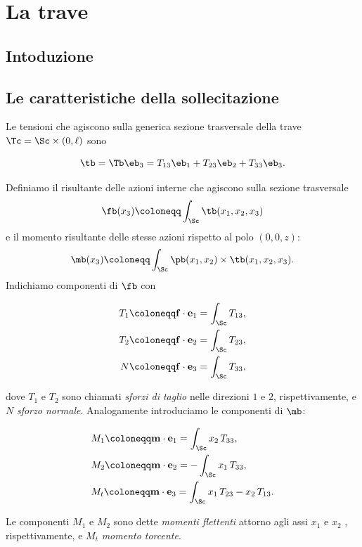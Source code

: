 \chapter{La trave}

\section{Intoduzione}
\lipsum[1]

\section{Le caratteristiche della sollecitazione}
Le tensioni che agiscono sulla generica sezione trasversale della trave $\Tc=\Sc \times (0,\ell)$  sono

\begin{equation}
\tb=\Tb\eb_3=T_{13}\eb_1+T_{23}\eb_2+T_{33}\eb_3.
\end{equation}

Definiamo il risultante   delle azioni interne che agiscono sulla sezione trasversale
\begin{equation}\label{f}
\fb(x_3)\coloneqq\int_{\Sc}\tb (x_1, x_2, x_3)
\end{equation}
e il momento risultante delle stesse azioni rispetto al polo $(0,0,z)$:
\begin{equation}
\mb(x_3)\coloneqq\int_{\Sc}\pb(x_1,x_2) \times \tb(x_1, x_2, x_3).
\end{equation}
Indichiamo componenti di $\fb$ con 
\begin{definition}
	\begin{equation}\label{cds}
	\begin{aligned}
		T_1&\coloneqq \mathbf{f}\cdot\mathbf{e}_1=\int_\Sc T_{13},\\
		T_2&\coloneqq \mathbf{f}\cdot\mathbf{e}_2=\int_\Sc T_{23},\\
		N&\coloneqq \mathbf{f}\cdot\mathbf{e}_3=\int_\Sc T_{33},
\end{aligned}
\end{equation}
\end{definition}
dove $T_1$ e $T_2$ sono chiamati \textit{sforzi di taglio} nelle direzioni $1$ e $2$, rispettivamente, e $N$ \textit{sforzo normale}. Analogamente introduciamo le componenti di $\mb$:
\begin{definition}
	\begin{equation}\label{cds1}
	\begin{aligned}
		&M_1\coloneqq \mathbf{m}\cdot\mathbf{e}_1=\int_\Sc x_2\,T_{33},\\
		&M_2\coloneqq \mathbf{m}\cdot\mathbf{e}_2=-\int_\Sc x_1\,T_{33},\\
		&M_t\coloneqq \mathbf{m}\cdot\mathbf{e}_3=\int_\Sc x_1\,T_{23}-x_2\,T_{13}.
		\end{aligned}
\end{equation}
\end{definition}
Le componenti $M_1$ e $M_2$ sono dette \textit{momenti flettenti} attorno agli assi $x_1$ e $x_2$ , rispettivamente, e $M_t$ \textit{momento torcente}.

